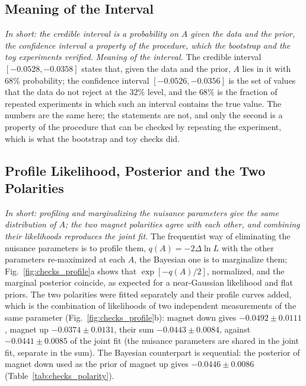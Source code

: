 \subsection{Meaning of the Interval}
\emph{In short: the credible interval is a probability on $A$ given the data and the prior, the confidence interval a property of the procedure, which the bootstrap and the toy experiments verified.}
\emph{Meaning of the interval.} The credible interval $[-0.0528,-0.0358]$ states that, given the data and the prior, $A$ lies in it with $68\%$ probability; the confidence interval $[-0.0526,-0.0356]$ is the set of values that the data do not reject at the $32\%$ level, and the $68\%$ is the fraction of repeated experiments in which such an interval contains the true value. The numbers are the same here; the statements are not, and only the second is a property of the procedure that can be checked by repeating the experiment, which is what the bootstrap and toy checks did.

\subsection{Profile Likelihood, Posterior and the Two Polarities}
\label{sec:checks_profile}
\emph{In short: profiling and marginalizing the nuisance parameters give the same distribution of $A$; the two magnet polarities agree with each other, and combining their likelihoods reproduces the joint fit.}
The frequentist way of eliminating the nuisance parameters is to profile them, $q(A)=-2\Delta\ln L$ with the other parameters re-maximized at each $A$, the Bayesian one is to marginalize them; Fig.~\ref{fig:checks_profile}a shows that $\exp[-q(A)/2]$, normalized, and the marginal posterior coincide, as expected for a near-Gaussian likelihood and flat priors. The two polarities were fitted separately and their profile curves added, which is the combination of likelihoods of two independent measurements of the same parameter (Fig.~\ref{fig:checks_profile}b): magnet down gives $-0.0492\pm0.0111$, magnet up $-0.0374\pm0.0131$, their sum $-0.0443\pm0.0084$, against $-0.0441\pm0.0085$ of the joint fit (the nuisance parameters are shared in the joint fit, separate in the sum). The Bayesian counterpart is sequential: the posterior of magnet down used as the prior of magnet up gives $-0.0446\pm0.0086$ (Table~\ref{tab:checks_polarity}).


